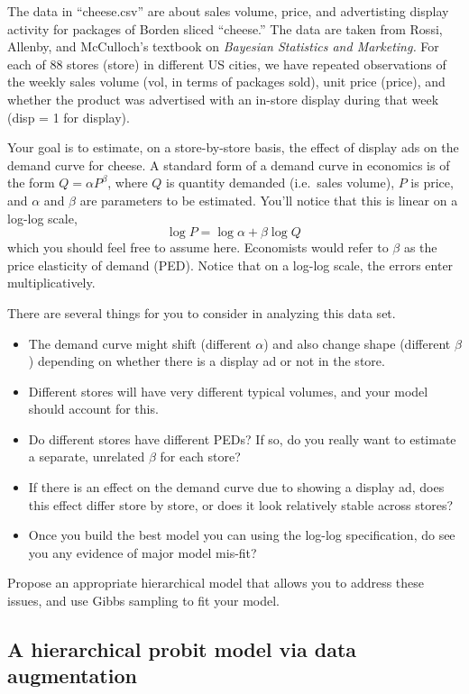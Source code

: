 \documentclass{article}
\begin{document}
The data in ``cheese.csv'' are about sales volume, price, and advertisting display activity for packages of Borden sliced ``cheese.'' The data are taken from Rossi, Allenby, and McCulloch's textbook on \textit{Bayesian Statistics and Marketing.} For each of 88 stores (store) in different US cities, we have repeated observations of the weekly sales volume (vol, in terms of packages sold), unit price (price), and whether the product was advertised with an in-store display during that week (disp = 1 for display).

Your goal is to estimate, on a store-by-store basis, the effect of display ads on the demand curve for cheese.  A standard form of a demand curve in economics is of the form $Q = \alpha P^\beta$, where $Q$ is quantity demanded (i.e.~sales volume), $P$ is price, and $\alpha$ and $\beta$ are parameters to be estimated.  You'll notice that this is linear on a log-log scale,
$$
\log P = \log \alpha + \beta \log Q \,
$$
which you should feel free to assume here.  Economists would refer to $\beta$ as the price elasticity of demand (PED).  Notice that on a log-log scale, the errors enter multiplicatively.

There are several things for you to consider in analyzing this data set.
\begin{itemize}
\item The demand curve might shift (different $\alpha$) and also change shape (different $\beta$) depending on whether there is a display ad or not in the store.
\item Different stores will have very different typical volumes, and your model should account for this.
\item Do different stores have different PEDs?  If so, do you really want to estimate a separate, unrelated $\beta$ for each store?
\item If there is an effect on the demand curve due to showing a display ad, does this effect differ store by store, or does it look relatively stable across stores?
\item Once you build the best model you can using the log-log specification, do see you any evidence of major model mis-fit?
\end{itemize}
Propose an appropriate hierarchical model that allows you to address these issues, and use Gibbs sampling to fit your model.



\subsection{A hierarchical probit model via data augmentation}
\end{document}
